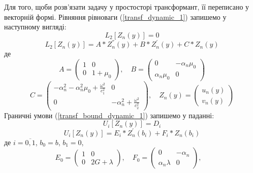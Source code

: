 Для того, щоби розв'язати задачу у простосторі трансформант, її переписано у векторній формі.
Рівняння рівноваги (\ref{transf_dynamic_1}) запишемо у наступному вигляді:
\begin{equation}\label{transf_mat_dynamic_1}
    L_2\left[ Z_n(y) \right] = 0
\end{equation}
\begin{equation}
    L_2\left[ Z_n(y) \right] = A * Z_n^{''}(y) + B * Z_n^{'}(y) + C * Z_n(y)
\end{equation}
де
\begin{equation*}
    A = \begin{pmatrix}
        1 & 0 \\
        0 & 1 + \mu_0
    \end{pmatrix}, \quad
    B = \begin{pmatrix}
        0 & -\alpha_n \mu_0 \\
        \alpha_n \mu_0 & 0
    \end{pmatrix}
\end{equation*}
\begin{equation*}
    C = \begin{pmatrix}
        -\alpha_n^2 -\alpha_n^2 \mu_0 + \frac{\omega^2}{c_1^2} & 0 \\
        0 & -\alpha_n^2 + \frac{\omega^2}{c_2^2}
    \end{pmatrix}, \quad
    Z_n(y) = \begin{pmatrix}
        u_n(y) \\
        v_n(y)
    \end{pmatrix}
\end{equation*}
Граничні умови (\ref{transf_bound_dynamic_1}) запишемо у паданні:
\begin{equation}\label{transf_bound_mat_dynamic_1}
    U_i\left[ Z_n(y) \right] = D_i
\end{equation}
\begin{equation}
    U_i\left[ Z_n(y) \right] = E_i * Z_n^{'}(b_i) + F_i * Z_n(b_i)
\end{equation}
де $i = \overline{0, 1}$, $b_0 = b$, $b_1 = 0$,
\begin{equation*}
    E_0 = \begin{pmatrix}
        1 & 0 \\
        0 & 2G + \lambda
    \end{pmatrix}, \quad
    F_0 = \begin{pmatrix}
        0 & -\alpha_n \\
        \alpha_n \lambda & 0
    \end{pmatrix}, \quad
\end{equation*}
